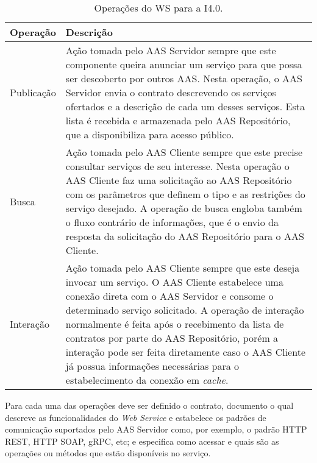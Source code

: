 \begin{table}[htb]
	\centering
	\begin{tabular}{p{3cm}p{12cm}}
		\hline
		\textbf{Operação}
		 & \textbf{Descrição}                                                                                                                                                                                                                                                                                                                                                                                                                                           \\

		\hline
		Publicação
		 & Ação tomada pelo AAS Servidor sempre que este componente queira anunciar um serviço para que possa ser descoberto por outros AAS. Nesta operação, o AAS Servidor envia o contrato descrevendo os serviços ofertados e a descrição de cada um desses serviços. Esta lista é recebida e armazenada pelo AAS Repositório, que a disponibiliza para acesso público.                                                                                              \\

		\hline
		Busca
		 & Ação tomada pelo AAS Cliente sempre que este precise consultar serviços de seu interesse. Nesta operação o AAS Cliente faz uma solicitação ao AAS Repositório com os parâmetros que definem o tipo e as restrições do serviço desejado. A operação de busca engloba também o fluxo contrário de informações, que é o envio da resposta da solicitação do AAS Repositório para o AAS Cliente.                                                                 \\

		\hline
		Interação
		 & Ação tomada pelo AAS Cliente sempre que este deseja invocar um serviço. O AAS Cliente estabelece uma conexão direta com o AAS Servidor e consome o determinado serviço solicitado. A operação de interação normalmente é feita após o recebimento da lista de contratos por parte do AAS Repositório, porém a interação pode ser feita diretamente caso o AAS Cliente já possua informações necessárias para o estabelecimento da conexão em \textit{cache}. \\

		\hline
	\end{tabular}
	\caption{Operações do WS para a I4.0.}
	\label{tab:operacoes-ws}
\end{table}

Para cada uma das operações deve ser definido o contrato, documento o qual descreve as funcionalidades do \textit{Web Service} e estabelece os padrões de comunicação suportados pelo AAS Servidor como, por exemplo, o padrão HTTP REST, HTTP SOAP, gRPC, etc; e especifica como acessar e quais são as operações ou métodos que estão disponíveis no serviço.

